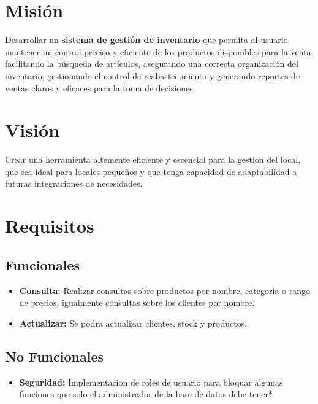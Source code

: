 \section*{\centering Misión}

Desarrollar un \textbf{sistema de gestión de inventario} que permita 
al usuario mantener un control preciso y eficiente de los productos disponibles para la venta, 
facilitando la búsqueda de artículos, asegurando una correcta organización del inventario, 
gestionando el control de reabastecimiento y generando reportes de ventas claros y eficaces para la toma de decisiones.

\section*{\centering Visión}

Crear una herramienta altemente eficiente y escencial para la gestion del
local, que sea ideal para locales pequeños y que tenga capacidad de adaptabilidad a futuras integraciones de necesidades.

\section*{\centering Requisitos}
\subsection*{Funcionales}
\begin{itemize}
    \item \textbf{Consulta:} Realizar consultas sobre productos por nombre, categoria o rango de precios, igualmente consultas sobre los clientes por nombre.
    \item \textbf{Actualizar:} Se podra actualizar clientes, stock y productos.
\end{itemize}
\subsection*{No Funcionales}
\begin{itemize}
    \item \textbf{Seguridad:} Implementacion de roles de usuario para bloquar algunas funciones que solo el administrador de la base de datos debe tener*
\end{itemize}
